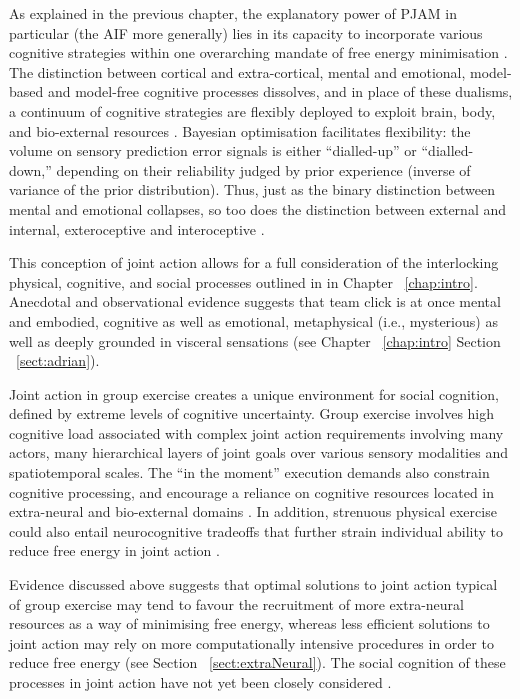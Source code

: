 \begin{CJK}{UTF8}{gbsn}
    As explained in the previous chapter, the explanatory power of PJAM in particular (the AIF more generally) lies in its capacity to incorporate various cognitive strategies within one overarching mandate of free energy minimisation \citep{Clark2015}.  The distinction between cortical and extra-cortical, mental and emotional, model-based and model-free cognitive processes dissolves, and in place of these dualisms, a continuum of cognitive strategies are flexibly deployed to exploit brain, body, and bio-external resources \citep{Pezzulo2013}.  Bayesian optimisation facilitates flexibility: the volume on sensory prediction error signals is either ``dialled-up'' or ``dialled-down,'' depending on their reliability judged by prior experience (inverse of variance of the prior distribution). Thus, just as the binary distinction between mental and emotional collapses, so too does the distinction between external and internal, exteroceptive and interoceptive \citep[and proprioceptive][]{Seth2013}.

    This conception of joint action allows for a full consideration of the interlocking physical, cognitive, and social processes outlined in in Chapter ~\ref{chap:intro}.   Anecdotal and observational evidence suggests that team click is at once mental and embodied, cognitive as well as emotional, metaphysical (i.e., mysterious) as well as deeply grounded in visceral sensations (see Chapter ~\ref{chap:intro} Section ~\ref{sect:adrian}).

    Joint action in group exercise creates a unique environment for social cognition, defined by extreme levels of cognitive uncertainty.  Group exercise involves high cognitive load associated with complex joint action requirements involving many actors, many hierarchical layers of joint goals over various sensory modalities and spatiotemporal scales. The ``in the moment'' execution demands also constrain cognitive processing, and encourage a reliance on cognitive resources located in extra-neural and bio-external domains \citep{Bourbousson2016}.  In addition, strenuous physical exercise could also entail neurocognitive tradeoffs that further strain individual ability to reduce free energy in joint action \citep{Dietrich2004b}.


    Evidence discussed above suggests that optimal solutions to joint action typical of group exercise may tend to favour the recruitment of more extra-neural resources as a way of minimising free energy, whereas less efficient solutions to joint action may rely on more computationally intensive procedures in order to reduce free energy (see Section ~\ref{sect:extraNeural}).  The social cognition of these processes in joint action have not yet been closely considered \citep[but see ][]{Marsh2009,Lumsden2012}.



\end{CJK}
